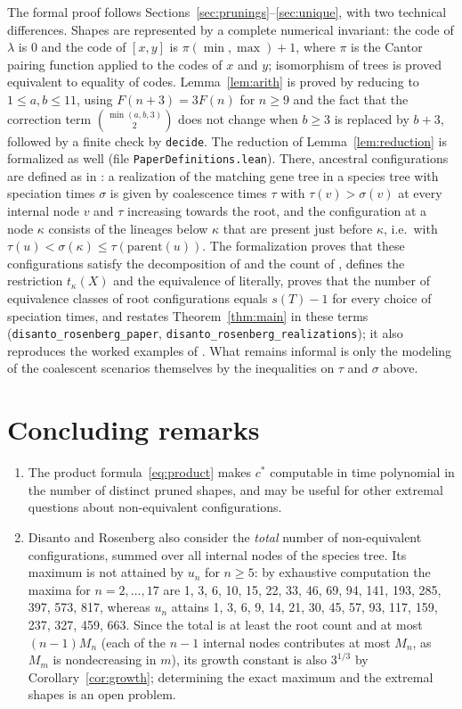 \documentclass[11pt]{amsart}
\theoremstyle{definition}
\theoremstyle{remark}
\newcommand{\lf}{\lambda}
\newcommand{\cstar}{c^{*}}
\begin{document}
The formal proof follows Sections~\ref{sec:prunings}--\ref{sec:unique}, with two technical differences.
Shapes are represented by a complete numerical invariant: the code of $\lf$ is $0$ and the code of $[x,y]$ is $\pi(\min,\max)+1$, where $\pi$ is the Cantor pairing function applied to the codes of $x$ and $y$; isomorphism of trees is proved equivalent to equality of codes.
Lemma~\ref{lem:arith} is proved by reducing to $1\le a,b\le 11$, using $F(n+3)=3F(n)$ for $n\ge 9$ and the fact that the correction term $\binom{\min(a,b,3)}{2}$ does not change when $b\ge 3$ is replaced by $b+3$, followed by a finite check by \texttt{decide}.
The reduction of Lemma~\ref{lem:reduction} is formalized as well (file \texttt{PaperDefinitions.lean}).
There, ancestral configurations are defined as in \cite[Sect.~2.3]{DR2019}: a realization of the matching gene tree in a species tree with speciation times $\sigma$ is given by coalescence times $\tau$ with $\tau(v)>\sigma(v)$ at every internal node $v$ and $\tau$ increasing towards the root, and the configuration at a node $\kappa$ consists of the lineages below $\kappa$ that are present just before $\kappa$, i.e.\ with $\tau(u)<\sigma(\kappa)\le\tau(\mathrm{parent}(u))$.
The formalization proves that these configurations satisfy the decomposition of \cite[Sect.~2.4]{DR2019} and the count of \cite[eq.~(5)]{DR2019}, defines the restriction $t_\kappa(X)$ and the equivalence of \cite[Sect.~3.1]{DR2019} literally, proves that the number of equivalence classes of root configurations equals $s(T)-1$ for every choice of speciation times, and restates Theorem~\ref{thm:main} in these terms (\texttt{disanto\_rosenberg\_paper}, \texttt{disanto\_rosenberg\_realizations}); it also reproduces the worked examples of \cite[Figs.~1, 2 and 5]{DR2019}.
What remains informal is only the modeling of the coalescent scenarios themselves by the inequalities on $\tau$ and $\sigma$ above.

\section{Concluding remarks}\label{sec:remarks}

\begin{enumerate}
\item The product formula~\eqref{eq:product} makes $\cstar$ computable in time polynomial in the number of distinct pruned shapes, and may be useful for other extremal questions about non-equivalent configurations.
\item Disanto and Rosenberg also consider the \emph{total} number of non-equivalent configurations, summed over all internal nodes of the species tree.
Its maximum is not attained by $u_n$ for $n\ge 5$: by exhaustive computation the maxima for $n=2,\dots,17$ are
1, 3, 6, 10, 15, 22, 33, 46, 69, 94, 141, 193, 285, 397, 573, 817,
whereas $u_n$ attains 1, 3, 6, 9, 14, 21, 30, 45, 57, 93, 117, 159, 237, 327, 459, 663.
Since the total is at least the root count and at most $(n-1)M_n$ (each of the $n-1$ internal nodes contributes at most $M_n$, as $M_m$ is nondecreasing in $m$), its growth constant is also $3^{1/3}$ by Corollary~\ref{cor:growth}; determining the exact maximum and the extremal shapes is an open problem.
\end{enumerate}
\end{document}
